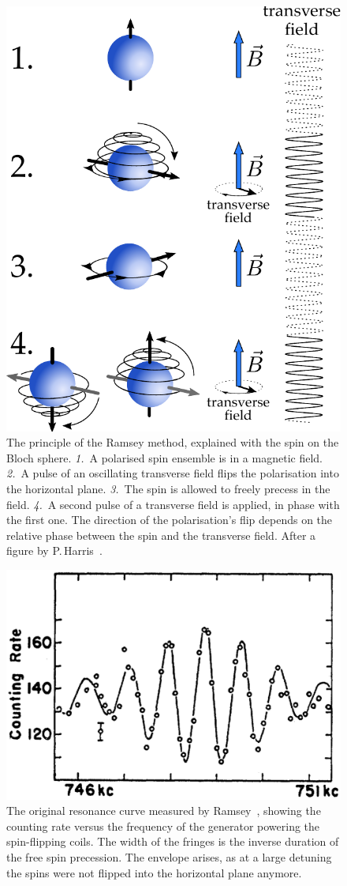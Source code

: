 \begin{figure}
  \centering
  \includegraphics[width=.6\linewidth]{gfx/nEDMatPSI/ramsey.pdf}
  \caption{The principle of the Ramsey method, explained with the spin on the Bloch sphere. \emph{1.}~A polarised spin ensemble is in a magnetic field. \emph{2.}~A pulse of an oscillating transverse field flips the polarisation into the horizontal plane. \emph{3.}~The spin is allowed to freely precess in the field. \emph{4.}~A second pulse of a transverse field is applied, in phase with the first one. The direction of the polarisation's flip depends on the relative phase between the spin and the transverse field.
  After a figure by P.\,Harris~\cite{Harris2007}.}\label{fig:nEDM_Ramsey_principle}
\end{figure}

\begin{figure}
  \centering
  \includegraphics[width=.6\linewidth]{gfx/introduction/Ramsey_original_resonance.png}
  \caption{The original resonance curve measured by Ramsey~\cite{PhysRev.108.120}, showing the counting rate versus the frequency of the generator powering the spin-flipping coils.
  The width of the fringes is the inverse duration of the free spin precession. The envelope arises, as at a large detuning the spins were not flipped into the horizontal plane anymore.}\label{fig:nEDM_Ramsey_original_curve}
\end{figure}


